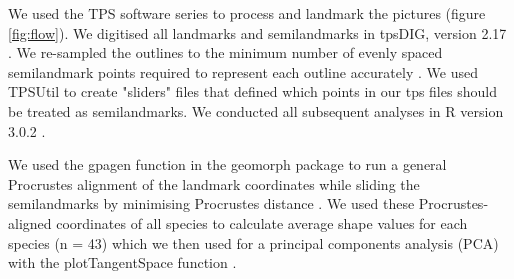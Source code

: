 \documentclass[12pt,a4paper]{article}
\begin{document}
	We used the TPS software series to process and landmark the pictures (figure \ref{fig:flow}). We digitised all landmarks and semilandmarks in tpsDIG, version 2.17 \citep{Rohlf2013}. We re-sampled the outlines to the minimum number of evenly spaced semilandmark points required to represent each outline accurately \citep[][details in supplementary material]{MacLeod2013}. We used TPSUtil \citep{Rohlf2012} to create "sliders" files \citep{Zelditch2012} that defined which points in our tps files should be treated as semilandmarks. We conducted all subsequent analyses in R version 3.0.2 \citep[][Figure \ref{fig:flow}]{Team2014}. 
	
	We used the gpagen function in the geomorph package \citep{Adams2013} to run a general Procrustes alignment \citep{Rohlf1993} of the landmark coordinates while sliding the semilandmarks by minimising Procrustes distance \citep{Bookstein1997}. We used these Procrustes-aligned coordinates of all species to calculate average shape values for each species (n = 43) which we then used for a principal components analysis (PCA) with the plotTangentSpace function \citep{Adams2013}. 
	
\end{document}
